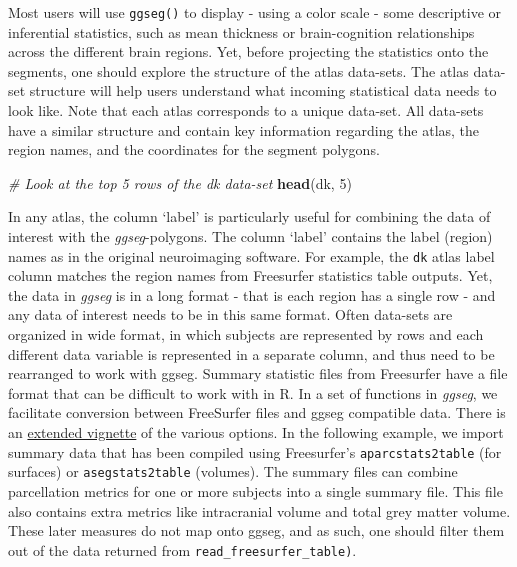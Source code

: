 \documentclass[fleqn,10pt]{wlpeerj} %
\newenvironment{Shaded}{\begin{snugshade}}{\end{snugshade}}
\newcommand{\CommentTok}[1]{\textcolor[rgb]{0.56,0.35,0.01}{\textit{#1}}}
\newcommand{\DecValTok}[1]{\textcolor[rgb]{0.00,0.00,0.81}{#1}}
\newcommand{\KeywordTok}[1]{\textcolor[rgb]{0.13,0.29,0.53}{\textbf{#1}}}
\newcommand{\NormalTok}[1]{#1}
\begin{document}
Most users will use \texttt{ggseg()} to display - using a color scale - some descriptive or inferential statistics, such as mean thickness or brain-cognition relationships across the different brain regions.
Yet, before projecting the statistics onto the segments, one should explore the structure of the atlas data-sets.
The atlas data-set structure will help users understand what incoming statistical data needs to look like.
Note that each atlas corresponds to a unique data-set.
All data-sets have a similar structure and contain key information regarding the atlas, the region names, and the coordinates for the segment polygons.

\small

\begin{Shaded}
\begin{Highlighting}[]
\CommentTok{# Look at the top 5 rows of the dk data-set}
\KeywordTok{head}\NormalTok{(dk, }\DecValTok{5}\NormalTok{)}
\end{Highlighting}
\end{Shaded}

\normalsize

In any atlas, the column `label' is particularly useful for combining the data of interest with the \emph{ggseg}-polygons.
The column `label' contains the label (region) names as in the original neuroimaging software.
For example, the \texttt{dk} atlas label column matches the region names from Freesurfer statistics table outputs.
Yet, the data in \emph{ggseg} is in a long format - that is each region has a single row - and any data of interest needs to be in this same format.
Often data-sets are organized in wide format, in which subjects are represented by rows and each different data variable is represented in a separate column, and thus need to be rearranged to work with ggseg.
Summary statistic files from Freesurfer have a file format that can be difficult to work with in R.
In a set of functions in \emph{ggseg}, we facilitate conversion between FreeSurfer files and ggseg compatible data.
There is an \href{https://lcbc-uio.github.io/ggseg/articles/freesurfer_files.html}{extended vignette} of the various options.
In the following example, we import summary data that has been compiled using Freesurfer's \texttt{aparcstats2table} (for surfaces) or \texttt{asegstats2table} (volumes).
The summary files can combine parcellation metrics for one or more subjects into a single summary file.
This file also contains extra metrics like intracranial volume and total grey matter volume.
These later measures do not map onto ggseg, and as such, one should filter them out of the data returned from \texttt{read\_freesurfer\_table)}.
\end{document}
